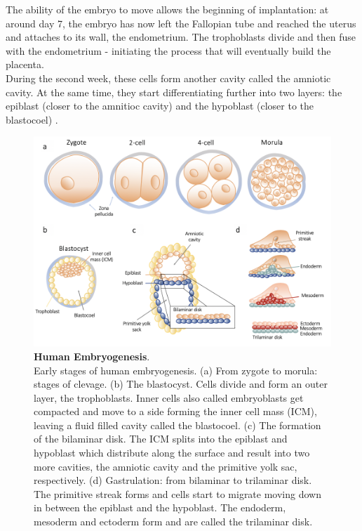 The ability of the embryo to move allows the beginning of implantation: at around day 7, the embryo has now left the Fallopian tube and reached the uterus and attaches to its wall, the endometrium.
The trophoblasts divide and then fuse with the endometrium - initiating the process that will eventually build the placenta.\\

During the second week, these cells form another cavity called the amniotic cavity. 
At the same time, they start differentiating further into two layers: the epiblast (closer to the amnitioc cavity) and the hypoblast (closer to the blastocoel) \cite{khan2015human}. 

\begin{figure}[h]
\centering
\includegraphics[width=14.5cm]{Chapter1/Fig/embryogenesis_til_gastrulation.png}
\caption[Human Embryogenesis]{\textbf{Human Embryogenesis}.\\
Early stages of human embryogenesis.
(a) From zygote to morula: stages of clevage.
(b) The blastocyst.
Cells divide and form an outer layer, the trophoblasts.
Inner cells also called embryoblasts get compacted and move to a side forming the inner cell mass (ICM), leaving a fluid filled cavity called the blastocoel.
(c) The formation of the bilaminar disk.
The ICM splits into the epiblast and hypoblast which distribute along the surface and result into two more cavities, the amniotic cavity and the primitive yolk sac, respectively.
(d) Gastrulation: from bilaminar to trilaminar disk.
The primitive streak forms and cells start to migrate moving down in between the epiblast and the hypoblast.
The endoderm, mesoderm and ectoderm form and are called the trilaminar disk.}
\label{fig:embryogenesis}
\end{figure}

